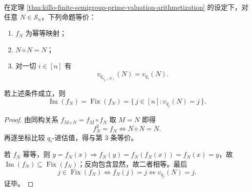 \begin{corollary}[投影幂等的素数寄存器方程]\label{cor:killo-projection-idempotent-prime-register}
在定理 \ref{thm:killo-finite-semigroup-prime-valuation-arithmetization} 的设定下，对任意 \(N\in\mathcal S_n\)，下列命题等价：
\begin{enumerate}
  \item \(f_N\) 为幂等映射；
  \item \(N\diamond N=N\)；
  \item 对一切 \(i\in[n]\) 有
  \[
  v_{q_{v_{q_i}(N)}}(N)=v_{q_i}(N).
  \]
\end{enumerate}
若上述条件成立，则
\[
\operatorname{Im}(f_N)=\operatorname{Fix}(f_N)=\{\,j\in[n]:v_{q_j}(N)=j\,\}.
\]
\end{corollary}
\begin{proof}
由同构关系
\(
f_{M\diamond N}=f_M\circ f_N
\)
取 \(M=N\) 即得
\[
f_N^2=f_N\iff N\diamond N=N.
\]
再逐坐标比较 \(q_i\)-进估值，得与第 3 条等价。

若 \(f_N\) 幂等，则 \(y=f_N(x)\Rightarrow f_N(y)=f_N(f_N(x))=f_N(x)=y\)，故 \(\operatorname{Im}(f_N)\subseteq\operatorname{Fix}(f_N)\)；反向包含显然，故二者相等。最后
\[
j\in\operatorname{Fix}(f_N)\iff f_N(j)=j\iff v_{q_j}(N)=j.
\]
证毕。
\end{proof}

